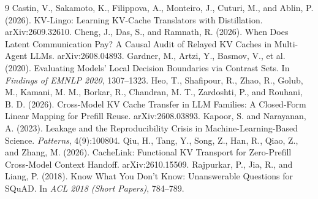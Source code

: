 \documentclass[11pt]{article}
\begin{document}
\begin{thebibliography}{9}
 Castin, V., Sakamoto, K., Filippova, A., Monteiro, J., Cuturi, M., and Ablin, P. (2026). KV-Lingo: Learning KV-Cache Translators with Distillation. arXiv:2609.32610.
 Cheng, J., Das, S., and Ramnath, R. (2026). When Does Latent Communication Pay? A Causal Audit of Relayed KV Caches in Multi-Agent LLMs. arXiv:2608.04893.
 Gardner, M., Artzi, Y., Basmov, V., et al. (2020). Evaluating Models' Local Decision Boundaries via Contrast Sets. In \emph{Findings of EMNLP 2020}, 1307--1323.
 Heo, T., Shafipour, R., Zhao, R., Golub, M., Kamani, M. M., Borkar, R., Chandran, M. T., Zardoshti, P., and Rouhani, B. D. (2026). Cross-Model KV Cache Transfer in LLM Families: A Closed-Form Linear Mapping for Prefill Reuse. arXiv:2608.03893.
 Kapoor, S. and Narayanan, A. (2023). Leakage and the Reproducibility Crisis in Machine-Learning-Based Science. \emph{Patterns}, 4(9):100804.
 Qiu, H., Tang, Y., Song, Z., Han, R., Qiao, Z., and Zhang, M. (2026). CacheLink: Functional KV Transport for Zero-Prefill Cross-Model Context Handoff. arXiv:2610.15509.
 Rajpurkar, P., Jia, R., and Liang, P. (2018). Know What You Don't Know: Unanswerable Questions for SQuAD. In \emph{ACL 2018 (Short Papers)}, 784--789.
\end{thebibliography}
\end{document}
